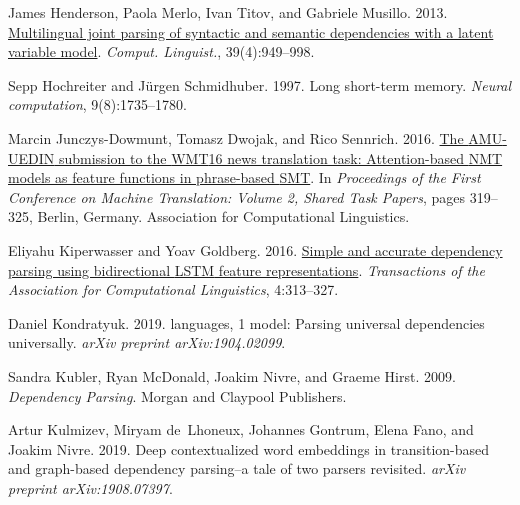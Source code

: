 \documentclass[11pt,a4paper]{article}
\begin{document}
\begin{thebibliography}{34}
James Henderson, Paola Merlo, Ivan Titov, and Gabriele Musillo. 2013.
\newblock \href {https://doi.org/10.1162/COLI_a_00158} {Multilingual joint
  parsing of syntactic and semantic dependencies with a latent variable model}.
\newblock \emph{Comput. Linguist.}, 39(4):949--998.

Sepp Hochreiter and J{\"u}rgen Schmidhuber. 1997.
\newblock Long short-term memory.
\newblock \emph{Neural computation}, 9(8):1735--1780.

Marcin Junczys-Dowmunt, Tomasz Dwojak, and Rico Sennrich. 2016.
\newblock \href {https://doi.org/10.18653/v1/W16-2316} {The {AMU}-{UEDIN}
  submission to the {WMT}16 news translation task: Attention-based {NMT} models
  as feature functions in phrase-based {SMT}}.
\newblock In \emph{Proceedings of the First Conference on Machine Translation:
  Volume 2, Shared Task Papers}, pages 319--325, Berlin, Germany. Association
  for Computational Linguistics.

Eliyahu Kiperwasser and Yoav Goldberg. 2016.
\newblock \href {https://doi.org/10.1162/tacl_a_00101} {Simple and accurate
  dependency parsing using bidirectional {LSTM} feature representations}.
\newblock \emph{Transactions of the Association for Computational Linguistics},
  4:313--327.

Daniel Kondratyuk. 2019.
 languages, 1 model: Parsing universal dependencies universally.
\newblock \emph{arXiv preprint arXiv:1904.02099}.

Sandra Kubler, Ryan McDonald, Joakim Nivre, and Graeme Hirst. 2009.
\newblock \emph{Dependency Parsing}.
\newblock Morgan and Claypool Publishers.

Artur Kulmizev, Miryam de~Lhoneux, Johannes Gontrum, Elena Fano, and Joakim
  Nivre. 2019.
\newblock Deep contextualized word embeddings in transition-based and
  graph-based dependency parsing--a tale of two parsers revisited.
\newblock \emph{arXiv preprint arXiv:1908.07397}.


\end{thebibliography}
\end{document}
